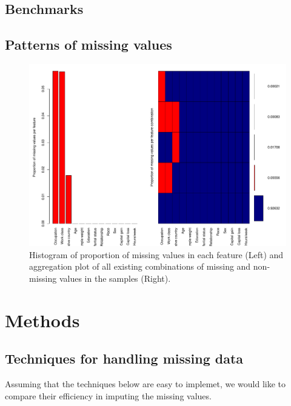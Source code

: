 \documentclass[12pt]{article}
\begin{document}
\subsection{Benchmarks}

\subsection{Patterns of missing values}

\begin{figure}[htbp] 
   \centering
   \includegraphics[scale=0.6]{missing-values-patterns.pdf} 
   \caption{Histogram of proportion of missing values in each feature (Left) and aggregation plot of all existing combinations of missing and non-missing values in the samples (Right).}
   \label{missing-values-patterns}
\end{figure}


\section{Methods}


\subsection{Techniques for handling missing data}
Assuming that the techniques below are easy to implemet, we would like to compare their efficiency in imputing the missing values.
\end{document}
